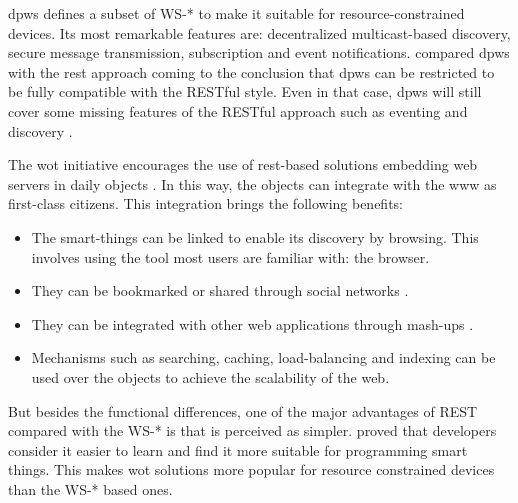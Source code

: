 

\ac{dpws} defines a subset of WS-* to make it suitable for resource-constrained devices.
Its most remarkable features are: decentralized multicast-based discovery, secure message transmission, subscription and event notifications.
\citet{moritz_devices_2010} compared \ac{dpws} with the \ac{rest} approach coming to the conclusion that \ac{dpws} can be restricted to be fully compatible with the RESTful style.
Even in that case, \ac{dpws} will still cover some missing features of the RESTful approach such as eventing and discovery \citep{moritz_devices_2010}.


The \acl{wot} initiative encourages the use of \acs{rest}-based solutions embedding web servers in daily objects \citep{guinard_internet_2011}.
In this way, the objects can integrate with the \ac{www} as first-class citizens. %
This integration brings the following benefits:
\begin{itemize}
  \item The smart-things can be linked to enable its discovery by browsing. This involves using the tool most users are familiar with: the browser.
  \item They can be bookmarked or shared through social networks \citep{guinard_sharing_2010}.
  \item They can be integrated with other web applications through mash-ups \citep{guinard_towards_2009,ostermaier_webplug:_2010,pintus_anatomy_2011}.
  \item Mechanisms such as searching, caching, load-balancing and indexing can be used over the objects to achieve the scalability of the web. %
\end{itemize}


But besides the functional differences, one of the major advantages of REST compared with the WS-* is that is perceived as simpler.
\citet{guinard_search_2011} proved that developers consider it easier to learn and find it more suitable for programming smart things.
This makes \ac{wot} solutions more popular for resource constrained devices than the WS-* based ones.

